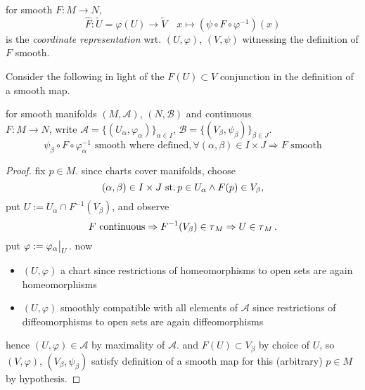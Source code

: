 \begin{defn}
  for smooth $F: M\rightarrow N$,
  \[
  \widehat F:\widetilde U = \varphi(U)\rightarrow \widetilde V
  \quad x\mapsto (\psi\circ F\circ\varphi^{-1})(x)
  \]
  is the \emph{coordinate representation} wrt.
  $(U,\varphi)$, $(V,\psi)$ witnessing the definition of $F$ smooth.
\end{defn}

\begin{Ex}{2.6}\label{ex:02:sm-coord-repr}
\end{Ex}

Consider the following in light of the $F(U)\subset V$
conjunction in the definition of a smooth map.

\begin{lem}\label{lem:2.3}
  for smooth manifolds $(M,\mathscr A)$, $(N,\mathscr B)$
  and continuous \\
  $F: M\rightarrow N$, write
  $\mathscr A =\{(U_\alpha, \varphi_\alpha)\}_{\alpha\in I}$,
  $\mathscr B =\{(V_\beta, \psi_\beta)\}_{\beta\in J}$.
  \[
  \psi_\beta\circ F\circ\varphi_\alpha^{-1}
  \text{ smooth where defined},
  \forall (\alpha,\beta)\in I\times J
  \Rightarrow
  F\text{ smooth}
  \]
\end{lem}
\begin{proof}
  fix $p\in M$.  since charts cover manifolds, choose
  \[
  (\alpha,\beta)\in I\times J \operatorname{\,st.} p\in U_\alpha\land F(p)\in V_\beta,
  \]
  put $U:=U_\alpha\cap F^{-1}(V_\beta)$, and observe
  \[
  F\text{ continuous} \Rightarrow
  F^{-1}(V_\beta)\in\operatorname{\tau}_M \Rightarrow
  U\in\operatorname{\tau}_M.
  \]
  put $\varphi:=\restr{\varphi_\alpha}{U}$.  now
  \begin{itemize}
  \item
    $(U,\varphi)$ a chart since restrictions of homeomorphisms
    to open sets are again homeomorphisms
  \item
    $(U,\varphi)$ smoothly compatible with all elements of
    $\mathscr A$ since restrictions of diffeomorphisms
    to open sets are again diffeomorphisms
  \end{itemize}
  hence $(U,\varphi)\in\mathscr A$ by maximality of $\mathscr A$.
  and $F(U)\subset V_\beta$ by choice of $U$, so
  $(V,\varphi)$, $(V_\beta,\psi_\beta)$ satisfy definition
  of a smooth map for this (arbitrary) $p\in M$
  by hypothesis.
\end{proof}

